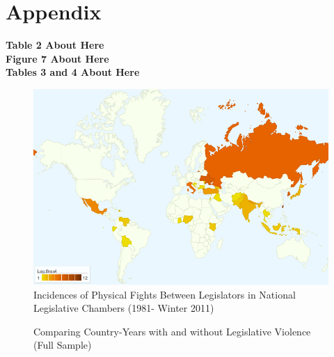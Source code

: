 \documentclass[a4paper]{article}\usepackage{graphicx, color}
\begin{document}
{{%

\section*{Appendix}

\begin{center}

    {\bf{Table 2 About Here}} \\
    {\bf{Figure 7 About Here}} \\
    {\bf{Tables 3 and 4 About Here}}

\end{center}







\theendnotes


\begin{figure}[h!]
    \centering
    \caption{Incidences of Physical Fights Between Legislators in National Legislative Chambers (1981- Winter 2011)}
    \label{leg_map}
        \includegraphics[width = 13cm]{incidence_map.png}
\end{figure}



\begin{figure}
    \caption{Comparing Country-Years with and without Legislative Violence (Full Sample)}
    \label{UDSAgeScatter}
    \begin{center}


\end{center}
\end{figure}}}
\end{document}
